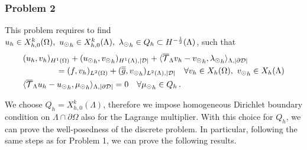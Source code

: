 
\subsubsection{Problem 2}
This problem requires to find  $u_h \in X_{h,0}^k(\Omega) ,\ {u_{\odot}}_h \in X_{h,0}^k(\Lambda), \ {\lambda_{\odot}}_h \in Q_h \subset H^{-\frac12}(\Lambda)$, such that
\begin{subequations}
\begin{align}\label{eq:prob2_discrete}
&(u_h,v_h)_{H^1(\Omega)} + ({\ud}_h,{\vd}_h)_{H^1(\Lambda), |{\cal D}|} 
+  \langle  \mtrace v_h -  {\vd}_h, {\ld}_h \rangle_{\Lambda, |\DD|} 
\\
\nonumber
&\qquad\qquad= (f,v_h)_{L^2(\Omega)} + (\avrd{g},{\vd}_h)_{L^2(\Lambda), |{\cal D}|}
\quad \forall v_h \in X_h(\Omega), \ {\vd}_h \in X_h(\Lambda)
\\
&  \langle \mtrace u_h - {\ud}_h, {\md}_h \rangle_{\Lambda,| \DD| } = 0
\quad \forall {\md}_h \in Q_h\,.
\end{align}
\end{subequations}

We choose $Q_h=X_{h,0}^k(\Lambda)$, therefore we impose homogeneous Dirichlet boundary condition on $\Lambda \cap \partial \Omega$ also for the Lagrange multiplier. With this choice for $Q_h$, we can prove the well-posedness of the discrete problem. In particular, following the same steps as for Problem 1, we can prove the following results.

